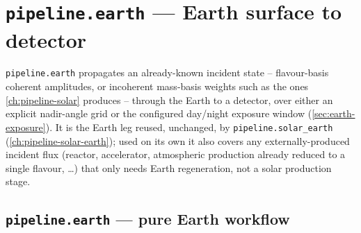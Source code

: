 \chapter{\texttt{pipeline.earth} --- Earth surface to detector}
\label{ch:pipeline-earth}

\texttt{pipeline.earth} propagates an already-known incident state --
flavour-basis coherent amplitudes, or incoherent mass-basis weights such as
the ones \cref{ch:pipeline-solar} produces -- through the Earth to a
detector, over either an explicit nadir-angle grid or the configured
day/night exposure window (\cref{sec:earth-exposure}). It is the Earth leg
reused, unchanged, by \texttt{pipeline.solar\_earth}
(\cref{ch:pipeline-solar-earth}); used on its own it also covers any
externally-produced incident flux (reactor, accelerator, atmospheric
production already reduced to a single flavour, \ldots) that only needs
Earth regeneration, not a solar production stage.

\section{\texttt{pipeline.earth} --- pure Earth workflow}


